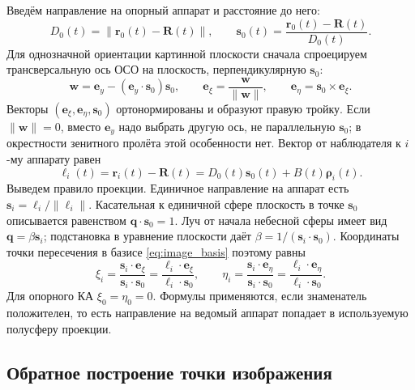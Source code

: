 \documentclass[a4paper,12pt]{article}
\begin{document}
Введём направление на опорный аппарат и расстояние до него:
\begin{equation}
    D_0(t)=\|\mathbf r_0(t)-\mathbf R(t)\|,
    \qquad
    \mathbf s_0(t)=\frac{\mathbf r_0(t)-\mathbf R(t)}{D_0(t)}.
    \label{eq:chief_sight}
\end{equation}
Для однозначной ориентации картинной плоскости сначала спроецируем
трансверсальную ось ОСО на плоскость, перпендикулярную $\mathbf s_0$:
\begin{equation}
 \mathbf w=\mathbf e_y-(\mathbf e_y\cdot\mathbf s_0)\mathbf s_0,\qquad
 \mathbf e_\xi=\frac{\mathbf w}{\|\mathbf w\|},\qquad
 \mathbf e_\eta=\mathbf s_0\times\mathbf e_\xi.
 \label{eq:image_basis}
\end{equation}
Векторы $(\mathbf e_\xi,\mathbf e_\eta,\mathbf s_0)$ ортонормированы и
образуют правую тройку. Если $\|\mathbf w\|=0$, вместо $\mathbf e_y$
надо выбрать другую ось, не параллельную $\mathbf s_0$; в окрестности
зенитного пролёта этой особенности нет. Вектор от наблюдателя к $i$-му
аппарату равен
\begin{equation}
    \boldsymbol\ell_i(t)=\mathbf r_i(t)-\mathbf R(t)
    =D_0(t)\mathbf s_0(t)+B(t)\boldsymbol\rho_i(t).
    \label{eq:line_of_sight}
\end{equation}
Выведем правило проекции. Единичное направление на аппарат есть
$\mathbf s_i=\boldsymbol\ell_i/\|\boldsymbol\ell_i\|$.
Касательная к единичной сфере плоскость в точке $\mathbf s_0$
описывается равенством $\mathbf q\cdot\mathbf s_0=1$. Луч от начала
небесной сферы имеет вид $\mathbf q=\beta\mathbf s_i$; подстановка в
уравнение плоскости даёт
$\beta=1/(\mathbf s_i\cdot\mathbf s_0)$. Координаты точки пересечения
в базисе \eqref{eq:image_basis} поэтому равны
\begin{equation}
 \xi_i=\frac{\mathbf s_i\cdot\mathbf e_\xi}
              {\mathbf s_i\cdot\mathbf s_0}
      =\frac{\boldsymbol\ell_i\cdot\mathbf e_\xi}
              {\boldsymbol\ell_i\cdot\mathbf s_0},
 \qquad
 \eta_i=\frac{\mathbf s_i\cdot\mathbf e_\eta}
              {\mathbf s_i\cdot\mathbf s_0}
      =\frac{\boldsymbol\ell_i\cdot\mathbf e_\eta}
              {\boldsymbol\ell_i\cdot\mathbf s_0}.
    \label{eq:gnomonic}
\end{equation}
Для опорного КА $\xi_0=\eta_0=0$. Формулы применяются, если знаменатель положителен, то есть направление на ведомый аппарат попадает в используемую полусферу проекции.

\subsection{Обратное построение точки изображения}
\end{document}
